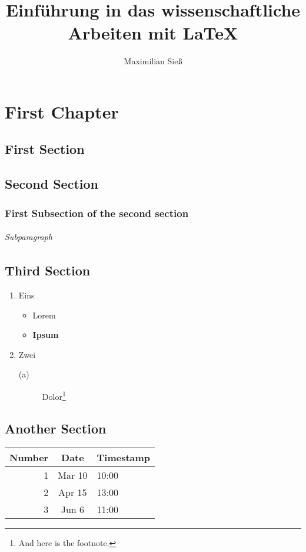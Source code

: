 \documentclass[10pt]{report}
\begin{document}
\title{Einführung in das wissenschaftliche Arbeiten mit \LaTeX}
\author{Maximilian Sieß}
\maketitle

\tableofcontents

\chapter{First Chapter}

	\section{First Section}

	\section{Second Section}
	
		\subsection{First Subsection of the second section}

			\subparagraph{Subparagraph}

	\section{Third Section}
	
	\begin{enumerate}
		\item Eins
		\begin{itemize}
			\item Lorem
			\item \textbf{Ipsum}
		\end{itemize}
		\item Zwei
		\begin{description}
			\item[(a)] Dolor\footnote{And here is the footnote.}
		\end{description}
	\end{enumerate}
	
	\section{Another Section}
	
	\begin{center}
  		\begin{tabular}{ || r  c  l  || }
 		   \hline
    		\textbf{Number} & \textbf{Date} & \textbf{Timestamp} \\ \hline
    		1 & Mar 10 & 10:00 \\ \hline
    		2 & Apr 15 & 13:00 \\ \hline
    		3 & Jun 6 & 11:00 \\
    		\hline
  		\end{tabular}
  		
	\end{center}
	
\end{document}
